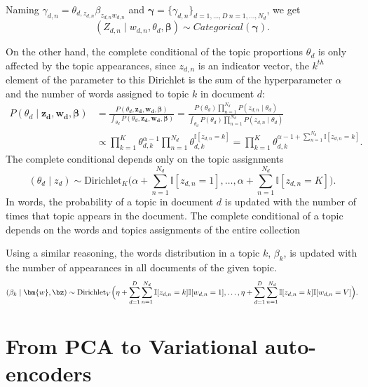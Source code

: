Naming \(\gamma_{d,n} = \theta_{d,z_{d,n}}\beta_{z_{d,n}w_{d,n}}\) and \(\bm{\gamma} = \{\gamma_{d,n}\}_{d=1,\dots,D \ n=1,\dots,N_{d}}\), we get
\[
  (Z_{d,n} \mid w_{d,n}, \theta_{d}, \bm{\beta}) \sim Categorical(\bm{\gamma}).
\]


On the other hand, the complete conditional of the topic proportions \(\theta_{d}\) is only affected by the topic appearances, since \(z_{d,n}\) is an indicator vector, the \(k^{th}\) element of the parameter to this Dirichlet is the sum of the hyperparameter \(\alpha\) and the number of words assigned to topic \(k\) in document \(d\):
\[
  \begin{aligned}
    P(\theta_{d} \mid \bm{z_{d}},\bm{w_{d}}, \bm{\beta}) &= \frac{P(\theta_{d}, \bm{z_{d}}, \bm{w_{d}}, \bm{\beta})}{\int_{\theta_{d}} P(\theta_{d}, \bm{z_{d}}, \bm{w_{d}}, \bm{\beta})} = \frac{ P(\theta_{d})\prod_{n=1}^{N_{d}}P(z_{d,n}\mid \theta_{d}) }{ \int_{\theta_{d}}  P(\theta_{d})\prod_{n=1}^{N_{d}}P(z_{d,n}\mid \theta_{d})  }\\
    &\propto \prod_{k=1}^{K}\theta_{d,k}^{\alpha-1} \prod_{n=1}^{N_{d}}\theta_{d,k}^{\mathbb{I}[z_{d,n}=k]} = \prod_{k=1}^{K}\theta_{d,k}^{\alpha -1 + \sum_{n=1}^{N_{d}} \mathbb{I}[z_{d,n}=k] }.
  \end{aligned}
\]
The complete conditional depends only on the topic assignments
\[
  (\theta_{d} \mid z_{d}) \sim \text{Dirichlet}_{K}\Big(\alpha + \sum_{n=1}^{N_{d}} \mathbb{I}[z_{d,n}=1],\dots, \alpha + \sum_{n=1}^{N_{d}} \mathbb{I}[z_{d,n}=K]\Big).
\]
In words, the probability of a topic in document \(d\) is updated with the number of times that topic appears in the document. The complete conditional of a topic depends on the words and topics assignments of the entire collection

Using a similar reasoning, the words distribution in a topic \(k\), \(\beta_{k}\), is updated with the number of appearances in all documents of the given topic.
\[
  (\beta_{k} \mid \bm{w}, \bz) \sim \text{Dirichlet}_{V}\Big(\eta + \sum_{d=1}^{D}\sum_{n=1}^{N_{d}}\mathbb{I}[z_{d,n} = k]\mathbb{I}[w_{d,n} = 1], \dots, \eta + \sum_{d=1}^{D}\sum_{n=1}^{N_{d}}\mathbb{I}[z_{d,n} = k]\mathbb{I}[w_{d,n} = V]\Big).
\]

\section{From PCA to Variational auto-encoders}

